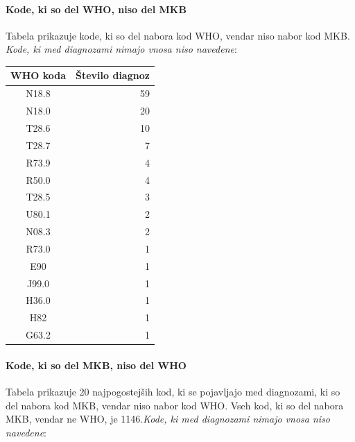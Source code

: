 \documentclass[a4paper,12pt]{report}
\begin{document}
\pagebreak
\paragraph{Kode, ki so del WHO, niso del MKB}
Tabela prikazuje kode, ki so del nabora kod WHO, vendar niso nabor kod MKB. \textit{Kode, ki med diagnozami nimajo vnosa niso navedene}:

\begin{center}
   \begin{tabular}{||c|r||}
      \hline
      WHO koda & Število diagnoz\\
      \hline
      \hline
      N18.8 & 59\\
      N18.0 & 20\\
      T28.6 & 10\\
      T28.7 & 7\\
      R73.9 & 4\\
      R50.0 & 4\\
      T28.5 & 3\\
      U80.1 & 2\\
      N08.3 & 2\\
      R73.0 & 1\\
      E90 & 1\\
      J99.0 & 1\\
      H36.0 & 1\\
      H82 & 1\\
      G63.2 & 1\\
      \hline

   \end{tabular}
\end{center}

\pagebreak
\paragraph{Kode, ki so del MKB, niso del WHO}
Tabela prikazuje 20 najpogostejših kod, ki se pojavljajo med diagnozami, ki so del nabora kod MKB, vendar niso nabor kod WHO. 
Vseh kod, ki so del nabora MKB, vendar ne WHO, je 1146.\textit{Kode, ki med diagnozami nimajo vnosa niso navedene}:
\end{document}
